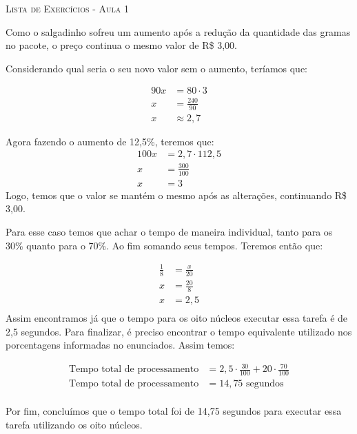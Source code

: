 \documentclass{scrartcl} %
\newcommand{\titulo}[1]{%
\begin{center}
    {\LARGE {\scshape #1}}
\end{center}
}
\newcounter{Exer}
\theoremstyle{geral}
\newcommand{\titulo}[1]{%
\begin{center}
    {\LARGE {\scshape #1}}
\end{center}
}
\begin{document}
\titulo{Lista de Exercícios - Aula 1}

\begin{multicols}{2}

\setlength\columnseprule{1pt}
\def\columnseprulecolor{\color{corlinha}}%

\begin{question}
Como o salgadinho sofreu um aumento após a redução da quantidade das gramas no pacote, o preço continua o mesmo valor de R\$ 3,00.

Considerando qual seria o seu novo valor sem o aumento, teríamos que:

\begin{align*}
90x &= 80 \cdot 3   \\
x &= \frac{240}{90} \\
x &\approx 2,7
 \end{align*}
 
Agora fazendo o aumento de 12,5\%, teremos que:
\begin{align*}
   100x &= 2,7 \cdot 112,5\\
   x &= \frac{300}{100} \\
   x &= 3
\end{align*}
Logo, temos que o valor se mantém o mesmo após as alterações, continuando R\$ 3,00.
\end{question}


\begin{question}
Para esse caso temos que achar o tempo de maneira individual, tanto para os 30\% quanto para o 70\%. Ao fim somando seus tempos. Teremos então que:

\begin{align*}
\frac{1}{8}&= \frac{x}{20} \\
x&= \frac{20}{8} \\
x &= 2,5\\
 \end{align*}
Assim encontramos já que o tempo para os oito núcleos executar essa tarefa é de 2,5 segundos. Para finalizar, é preciso encontrar o tempo equivalente utilizado nos porcentagens informadas no enunciados. Assim temos:

\begin{align*}
\textrm{Tempo total de processamento} &= 2,5 \cdot \frac{30}{100} + 20 \cdot \frac{70}{100}\\
\textrm{Tempo total de processamento} &= 14,75 \textrm{ segundos}\\
 \end{align*}
 
Por fim, concluímos que o tempo total foi de 14,75 segundos para executar essa tarefa utilizando os oito núcleos.
\end{question}


\end{multicols}
\end{document}
